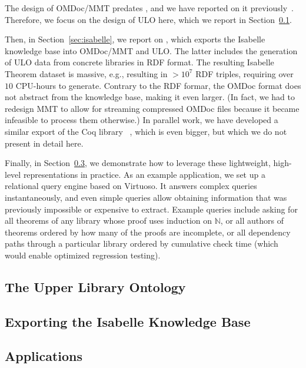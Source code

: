 The design of OMDoc/MMT predates \pn, and we have reported on it previously~\cite{Kohlhase:OMDoc1.2,RabKoh:WSMSML13,DehKohKon:iop16,KohMuePfe:kbimss17}.
Therefore, we focus on the design of ULO here, which we report in Section~\ref{sec:ulo}.

Then, in Section~\ref{sec:isabelle}, we report on , which exports the Isabelle knowledge base into OMDoc/MMT and ULO.  The latter includes the generation of ULO data from concrete libraries in RDF format.  The resulting Isabelle Theorem dataset is massive, e.g., resulting in $>10^7$ RDF triples, requiring over $10$ CPU-hours to generate.
Contrary to the RDF formar, the OMDoc format does not abstract from the knowledge base, making it even larger. (In fact, we had to redesign MMT to allow for streaming compressed OMDoc files because it became infeasible to process them otherwise.)
In parallel work, we have developed a similar export of the Coq library ~\cite{MueRabSac:cltg19}, which is even bigger, but which we do not present in detail here.

Finally, in Section~\ref{sec:uloappl}, we demonstrate how to leverage these lightweight, high-level representations in practice.
As an example application, we set up a relational query engine based on Virtuoso.
It answers complex queries instantaneously, and even simple queries allow obtaining information that was previously impossible or expensive to extract.
Example queries include asking for all theorems of any library whose proof uses induction on $\mathbb{N}$,
or all authors of theorems ordered by how many of the proofs are incomplete,
or all dependency paths through a particular library ordered by cumulative check time (which would enable optimized regression testing).

\subsection{The Upper Library Ontology}\label{sec:ulo}


\subsection{Exporting the Isabelle Knowledge Base}\label{sec:isabelle-export}


\subsection{Applications}\label{sec:uloappl}



